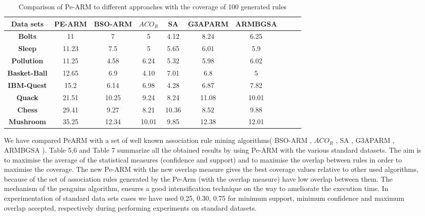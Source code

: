 \documentclass[preprint,12pt]{elsarticle}
\begin{document}
\begin{table}[htbp]
\small
\centering
\caption{Comparison of Pe-ARM to  different approaches with the coverage of 100 generated rules}
\begin{tabular}{c c c c c c c c c c}
\toprule
\textbf{Data sets} & PE-ARM& BSO-ARM & $ACO_{R}$ & SA & G3APARM & ARMBGSA \\
\midrule
\textbf{Bolts}&11&	7	& 5& 4.12 & 8.24 & 6.25 &\\\hline
\textbf{Sleep}&11.23& 7.5	& 5 & 5.65 & 6.01 & 5.9 &\\\hline
\textbf{Pollution}&11.25&	4.58 & 6.24 & 5.32 & 5.98 & 6.02 &\\\hline
\textbf{Basket-Ball}&12.65&	6.9 & 4.10 & 7.01 & 6.8 & 5 &\\\hline
\textbf{IBM-Quest}&15.2& 6.14	& 6.98 & 4.28 & 6.87 & 7.82 &\\\hline
\textbf{Quack}&21.51&	10.25	& 9.24 & 8.24 & 11.08 & 10.01 &\\\hline
\textbf{Chess}&29.41&	9.27	& 8.21 & 10.36 & 8.52 & 9.88 &\\\hline
\textbf{Mushroom}&35.25& 12.34	& 10.01 & 9.85 & 12.38 & 12.01 &\\\hline
\bottomrule
\end{tabular}
\end{table}
\newpage
We have compared PeARM with a set of well known association rule mining algorithms( BSO-ARM \cite{22} , $ACO_{R}$ \cite{13}, 
SA \cite{30}, G3APARM  \cite{11},  ARMBGSA \cite{21}).
Table 5,6 and Table 7 summarize all the obtained results by using Pe-ARM with the various standard datasets. 
The aim is to maximise the average of the statistical measures (confidence and support) and to maximise the overlap 
between rules in order to maximise the coverage.
The new Pe-ARM with the new overlap measure gives the best coverage values relative to other used algorithms, 
because of the set of association rules generated by the Pe-Arm (with the overlap measure) have low overlap between them. 
The mechanism of the penguins algorithm, ensures a good intensification technique on the way to ameliorate the execution time.
In experimentation of standard data sets cases we have used 0.25, 0.30, 0.75 for minimum support, minimum confidence and maximum overlap accepted, respectively during performing experiments on standard datasets. 
\end{document}

